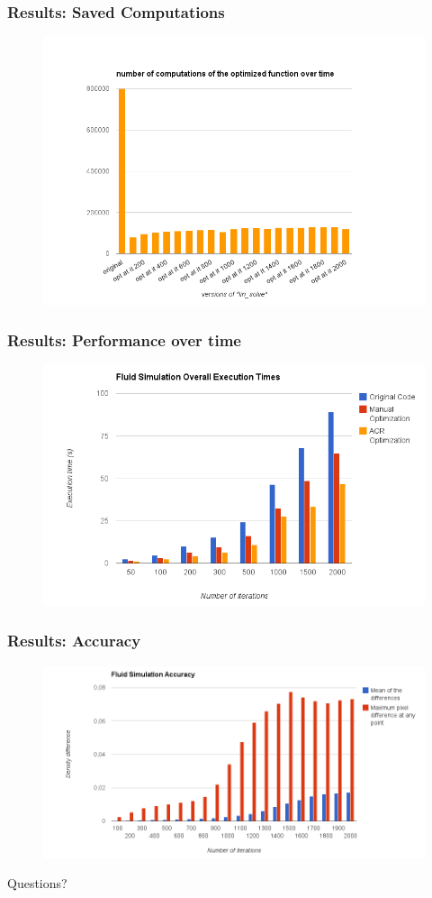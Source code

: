 \documentclass{beamer}\usetheme{Madrid} %
\begin{document}
\begin{frame}
\frametitle { Results: Saved Computations }
\begin{figure}
    \includegraphics[scale=0.40]{img/computations.png}
\end{figure}
\end{frame}
\begin{frame}
\frametitle { Results: Performance over time }
\begin{figure}
    \includegraphics[scale=0.60]{img/times.png}
\end{figure}
\end{frame}
\begin{frame}
\frametitle { Results: Accuracy }
\begin{figure}
    \includegraphics[scale=0.40]{img/accuracy.png}
\end{figure}
\end{frame}
\begin{frame}
    \centerline{Questions?}
\end{frame}
\end{document}

